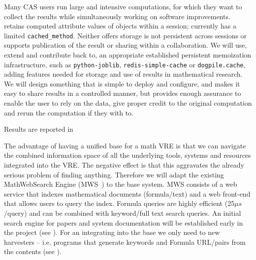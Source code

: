 \begin{workpackage}[id=dksbases,%
  title=Data/Knowledge/Software-Bases,lead=JU,
  ZHRM=12,JURM=46,UWRM=25,SARM=10,LLRM=2,PSRM=4]
\begin{tasklist}
\begin{task}[title=Memoization and production of new data,id=data-memo,
  lead=SA,partners={US,PS,UW},PM=12,wphases=24-42!.6]
  Many CAS users run large and intensive computations, for which they want to collect the
  results while simultaneously working on software improvements. \GAP retains computed
  attribute values of objects within a session; \Sage currently has a limited
  \lstinline{cached_method}. Neither offers storage is not persistent across sessions or
  supports publication of the result or sharing within a collaboration. We will use,
  extend and contribute back to, an appropriate established persistent memoization
  infrastructure, such as \texttt{python-joblib}, \texttt{redis-simple-cache} or
  \texttt{dogpile.cache}, adding features needed for storage and use of results in
  mathematical research. We will design something that is simple to deploy and configure,
  and makes it easy to share results in a controlled manner, but provides enough assurance
  to enable the user to rely on the data, give proper credit to the original computation
  and rerun the computation if they with to.

  Results are reported in 

\end{task}

\begin{task}[id=mws,title=Math Search Engine,lead=JU,PM=10]
  The advantage of having a unified \DKS base for a math VRE is that we can navigate the
  combined information space of all the underlying tools, systems and resources integrated
  into the VRE. The negative effect is that this aggravates the already serious problem of
  finding anything. Therefore we will adapt the existing MathWebSearch Engine
  (MWS~\cite{ProKoh:mwssofse12,MWSProj:on}) to the \DKS base system. MWS consists of a web
  service that indexes mathematical documents (formula/text) and a web front-end that
  allows users to query the index. Formula queries are highly efficient (25$\mu s$/query)
  and can be combined with keyword/full text search queries. An initial search engine for
  papers and system documentation will be established early in the project (see
  ). For an integrating into the \DKS base we only need to new
  harvesters -- i.e. programs that generate keywords and Formula URL/pairs from the
  contents (see ).


\end{task}
\end{tasklist}
\end{workpackage}

